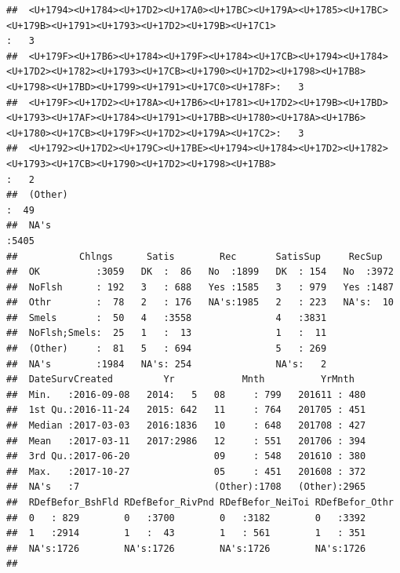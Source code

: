 \documentclass[11pt,]{article}
\begin{document}
\begin{verbatim}
##  <U+1794><U+1784><U+17D2><U+17A0><U+17BC><U+179A><U+1785><U+17BC><U+179B><U+1791><U+1793><U+17D2><U+179B><U+17C1>                                                                :   3    
##  <U+179F><U+17B6><U+1784><U+179F><U+1784><U+17CB><U+1794><U+1784><U+17D2><U+1782><U+1793><U+17CB><U+1790><U+17D2><U+1798><U+17B8><U+1798><U+17BD><U+1799><U+1791><U+17C0><U+178F>:   3    
##  <U+179F><U+17D2><U+178A><U+17B6><U+1781><U+17D2><U+179B><U+17BD><U+1793><U+17AF><U+1784><U+1791><U+17BB><U+1780><U+178A><U+17B6><U+1780><U+17CB><U+179F><U+17D2><U+179A><U+17C2>:   3    
##  <U+1792><U+17D2><U+179C><U+17BE><U+1794><U+1784><U+17D2><U+1782><U+1793><U+17CB><U+1790><U+17D2><U+1798><U+17B8>                                                                :   2    
##  (Other)                                                                                                                                                                         :  49    
##  NA's                                                                                                                                                                            :5405    
##           Chlngs      Satis        Rec       SatisSup     RecSup    
##  OK          :3059   DK  :  86   No  :1899   DK  : 154   No  :3972  
##  NoFlsh      : 192   3   : 688   Yes :1585   3   : 979   Yes :1487  
##  Othr        :  78   2   : 176   NA's:1985   2   : 223   NA's:  10  
##  Smels       :  50   4   :3558               4   :3831              
##  NoFlsh;Smels:  25   1   :  13               1   :  11              
##  (Other)     :  81   5   : 694               5   : 269              
##  NA's        :1984   NA's: 254               NA's:   2              
##  DateSurvCreated         Yr            Mnth          YrMnth    
##  Min.   :2016-09-08   2014:   5   08     : 799   201611 : 480  
##  1st Qu.:2016-11-24   2015: 642   11     : 764   201705 : 451  
##  Median :2017-03-03   2016:1836   10     : 648   201708 : 427  
##  Mean   :2017-03-11   2017:2986   12     : 551   201706 : 394  
##  3rd Qu.:2017-06-20               09     : 548   201610 : 380  
##  Max.   :2017-10-27               05     : 451   201608 : 372  
##  NA's   :7                        (Other):1708   (Other):2965  
##  RDefBefor_BshFld RDefBefor_RivPnd RDefBefor_NeiToi RDefBefor_Othr
##  0   : 829        0   :3700        0   :3182        0   :3392     
##  1   :2914        1   :  43        1   : 561        1   : 351     
##  NA's:1726        NA's:1726        NA's:1726        NA's:1726     
##                                                                   

\end{verbatim}
\end{document}
